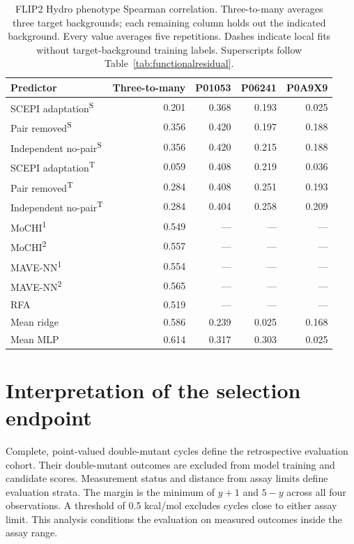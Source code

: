 \documentclass{llncs}
\begin{document}
\begin{table}[H]
\centering
\setlength{\tabcolsep}{4pt}
\caption{FLIP2 Hydro phenotype Spearman correlation. Three-to-many averages three target backgrounds; each remaining column holds out the indicated background. Every value averages five repetitions. Dashes indicate local fits without target-background training labels. Superscripts follow Table~\ref{tab:functionalresidual}.}
\label{tab:fliphydro}
\begin{tabular}{lrrrr}
\toprule
Predictor & Three-to-many & P01053 & P06241 & P0A9X9 \\
\midrule
SCEPI adaptation\textsuperscript{S} & 0.201 & 0.368 & 0.193 & 0.025 \\
Pair removed\textsuperscript{S} & 0.356 & 0.420 & 0.197 & 0.188 \\
Independent no-pair\textsuperscript{S} & 0.356 & 0.420 & 0.215 & 0.188 \\
SCEPI adaptation\textsuperscript{T} & 0.059 & 0.408 & 0.219 & 0.036 \\
Pair removed\textsuperscript{T} & 0.284 & 0.408 & 0.251 & 0.193 \\
Independent no-pair\textsuperscript{T} & 0.284 & 0.404 & 0.258 & 0.209 \\
MoCHI\textsuperscript{1} & 0.549 & --- & --- & --- \\
MoCHI\textsuperscript{2} & 0.557 & --- & --- & --- \\
MAVE-NN\textsuperscript{1} & 0.554 & --- & --- & --- \\
MAVE-NN\textsuperscript{2} & 0.565 & --- & --- & --- \\
RFA & 0.519 & --- & --- & --- \\
Mean ridge & 0.586 & 0.239 & 0.025 & 0.168 \\
Mean MLP & 0.614 & 0.317 & 0.303 & 0.025 \\
\bottomrule
\end{tabular}
\end{table}

\section{Interpretation of the selection endpoint}

Complete, point-valued double-mutant cycles define the retrospective evaluation cohort. Their double-mutant outcomes are excluded from model training and candidate scores. Measurement status and distance from assay limits define evaluation strata. The margin is the minimum of $y+1$ and $5-y$ across all four observations. A threshold of 0.5 kcal/mol excludes cycles close to either assay limit. This analysis conditions the evaluation on measured outcomes inside the assay range.
\end{document}
